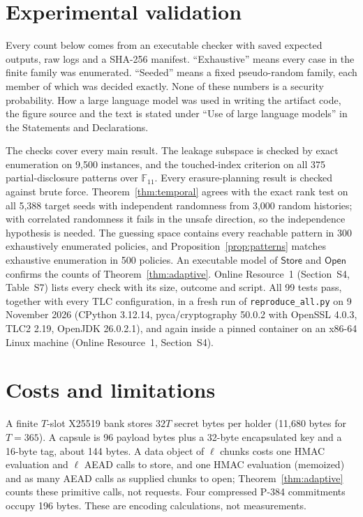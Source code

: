 \documentclass[pdflatex,sn-mathphys-num]{sn-jnl}%
\theoremstyle{plain}
\theoremstyle{definition}
\newcommand{\F}{\mathbb{F}}
\newcommand{\code}[1]{\texttt{#1}}
\begin{document}
\section{Experimental validation}\label{sec:evidence}

Every count below comes from an executable checker with saved expected outputs, raw logs and a SHA-256 manifest. ``Exhaustive'' means every case in the finite family was enumerated. ``Seeded'' means a fixed pseudo-random family, each member of which was decided exactly. None of these numbers is a security probability. How a large language model was used in writing the artifact code, the figure source and the text is stated under ``Use of large language models'' in the Statements and Declarations.

The checks cover every main result. The leakage subspace is checked by exact enumeration on 9,500 instances, and the touched-index criterion on all 375 partial-disclosure patterns over $\F_{11}$. Every erasure-planning result is checked against brute force. Theorem~\ref{thm:temporal} agrees with the exact rank test on all 5,388 target seeds with independent randomness from 3,000 random histories; with correlated randomness it fails in the unsafe direction, so the independence hypothesis is needed. The guessing space contains every reachable pattern in 300 exhaustively enumerated policies, and Proposition~\ref{prop:patterns} matches exhaustive enumeration in 500 policies. An executable model of $\mathsf{Store}$ and $\mathsf{Open}$ confirms the counts of Theorem~\ref{thm:adaptive}. Online Resource~1 (Section~S4, Table~S7) lists every check with its size, outcome and script. All 99 tests pass, together with every TLC configuration, in a fresh run of \code{reproduce\_all.py} on 9 November 2026 (CPython 3.12.14, pyca/cryptography 50.0.2 with OpenSSL 4.0.3, TLC2 2.19, OpenJDK 26.0.2.1), and again inside a pinned container on an x86-64 Linux machine (Online Resource~1, Section~S4).



\section{Costs and limitations}\label{sec:limits}

A finite $T$-slot X25519 bank stores $32T$ secret bytes per holder (11,680 bytes for $T=365$). A capsule is 96 payload bytes plus a 32-byte encapsulated key and a 16-byte tag, about 144 bytes. A data object of $\ell$ chunks costs one HMAC evaluation and $\ell$ AEAD calls to store, and one HMAC evaluation (memoized) and as many AEAD calls as supplied chunks to open; Theorem~\ref{thm:adaptive} counts these primitive calls, not requests. Four compressed P-384 commitments occupy 196 bytes. These are encoding calculations, not measurements.
\end{document}
